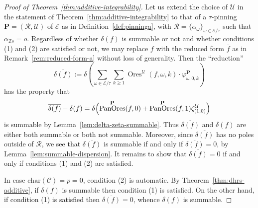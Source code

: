 \documentclass[preprint,12pt]{elsarticle}
\numberwithin{equation}{section} %
\theoremstyle{theorem}
\theoremstyle{definition}
\newcommand{\Ca}{\mathcal{C}} %
\newcommand{\ec}{\mathcal{E}} %
\newcommand{\idec}{{o}} %
\newcommand{\orbita}{{\ec/\tau}} %
\newcommand{\Z}{\mathbb{Z}} %
\newcommand{\za}[2]{\zeta^{\mathcal{U}}_{( {#1} , {#2} )}}
\DeclareMathOperator{\ores}{Ores}
\DeclareMathOperator{\pano}{PanOres}
\begin{document}
\begin{proof}[Proof of Theorem~\ref{thm:additive-integrability}] Let us extend the choice of $\mathcal{U}$ in the statement of Theorem~\ref{thm:additive-integrability} to that of a $\tau$-pinning $\mathbf{P}=(\mathcal{R},\mathcal{U})$ of $\ec$ as in Definition~\ref{def:pinninga}, with $\mathcal{R}=\{\alpha_\omega\}_{\omega\in\orbita}$ such that $\alpha_{\Z s}=\idec$. Regardless of whether $\delta(f)$ is summable or not and whether conditions (1) and (2) are satisfied or not, we may replace $f$ with the reduced form $\bar{f}$ as in Remark~\ref{rem:reduced-form-a} without loss of generality. Then the ``reduction'' \begin{equation}\label{eq:df-reduced}\overline{\delta(f)}:=\delta\left(\sum_{\omega\in\orbita}\sum_{k\geq 1}\ores^\mathcal{U}(f,\omega,k)\cdot\varphi^\mathbf{P}_{\omega,0,k}\right)\end{equation}  has the property that \[\overline{\delta(f)}-\delta(f)=\delta\Bigl(\pano^\mathbf{P}(f,0)+\pano^\mathbf{P}(f,1)\za{1}{0}\Bigr)\] is summable by Lemma~\ref{lem:delta-zeta-summable}. Thus $\overline{\delta(f)}$ and $\delta(f)$ are either both summable or both not summable. Moreover, since $\overline{\delta(f)}$ has no poles outside of $\mathcal{R}$, we see that $\overline{\delta(f)}$ is summable if and only if $\overline{\delta(f)}=0$, by Lemma~\ref{lem:summable-dispersion}. It remains to show that $\overline{\delta(f)}=0$ if and only if conditions (1) and (2) are satisfied.

In case $\mathrm{char}(\Ca)=p=0$, condition (2) is automatic. By Theorem~\ref{thm:dhrs-additive}, if $\delta(f)$ is summable then condition (1) is satisfied. On the other hand, if condition (1) is satisfied then $\overline{\delta(f)}=0$, whence $\delta(f)$ is summable.


\end{proof}
\end{document}
